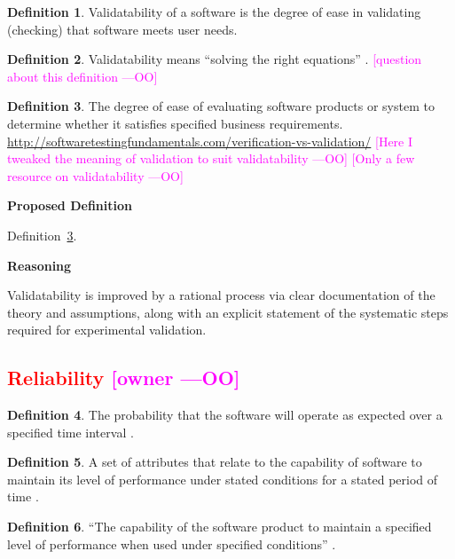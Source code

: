 \documentclass[letterpaper,cleveref]{lipics-v2019}
\newcommand{\authornote}[3]{\textcolor{#1}{[#3 ---#2]}}
\newcommand{\authornote}[3]{}
\newcommand{\oo}[1]{\authornote{magenta}{OO}{#1}} %
\newcommand{\notdone}[1]{\textcolor{red}{#1}}
\theoremstyle{definition}
\newtheorem{defn}{Definition}
\begin{document}
\begin{defn}
  Validatability of a software is the degree of ease in validating (checking)
  that software meets user needs.
\end{defn}

\begin{defn}
  Validatability means ``solving the right equations'' \citep[p.~23]{Roache1998}.
  \oo{question about this definition}
\end{defn}

\begin{defn} \label{DefnValidatability}
  The degree of ease of evaluating software products or system to determine
  whether it satisfies specified business
  requirements. \url{http://softwaretestingfundamentals.com/verification-vs-validation/}
  \oo{Here I tweaked the meaning of validation to suit validatability} \oo{Only
    a few resource on validatability}
\end{defn}

\noindent \textbf{Proposed Definition}

Definition~\ref{DefnValidatability}.

\noindent \textbf{Reasoning}

Validatability is improved by a rational process via clear documentation of the
theory and assumptions, along with an explicit statement of the systematic steps
required for experimental validation.

\subsection{\notdone{Reliability} \oo{owner}}

\begin{defn}
  The probability that the software will operate as expected over a specified
  time interval \citep{GhezziEtAl2003}.
\end{defn}

\begin{defn}
  A set of attributes that relate to the capability of software to maintain its
  level of performance under stated conditions for a stated period of time
  \citep{berander2005software}.
\end{defn}

\begin{defn}
  ``The capability of the software product to maintain a specified level of
  performance when used under specified conditions''
  \citep{international2001iso}.
\end{defn}
\end{document}
